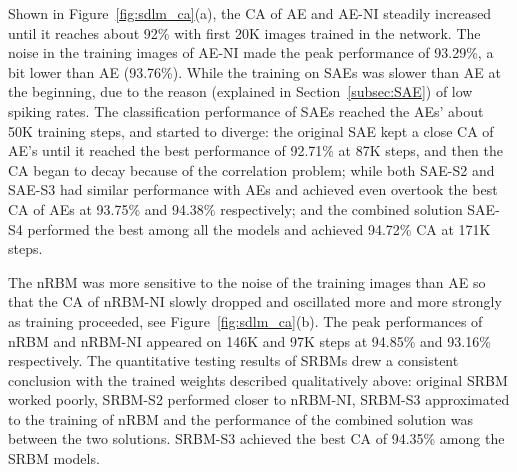 Shown in Figure~\ref{fig:sdlm_ca}(a), the CA of AE and AE-NI steadily increased until it reaches about 92\% with first 20K images trained in the network.
The noise in the training images of AE-NI made the peak performance of 93.29\%, a bit lower than AE (93.76\%).
While the training on SAEs was slower than AE at the beginning, due to the reason (explained in Section~\ref{subsec:SAE}) of low spiking rates.
The classification performance of SAEs reached the AEs' about 50K training steps, and started to diverge:
the original SAE kept a close CA of AE's until it reached the best performance of 92.71\% at 87K steps, and then the CA began to decay because of the correlation problem;
while both SAE-S2 and SAE-S3 had similar performance with AEs and achieved even overtook the best CA of AEs at 93.75\% and 94.38\% respectively;
and the combined solution SAE-S4 performed the best among all the models and achieved 94.72\% CA at 171K steps.

The nRBM was more sensitive to the noise of the training images than AE so that the CA of nRBM-NI slowly dropped and oscillated more and more strongly as training proceeded, see Figure~\ref{fig:sdlm_ca}(b).
The peak performances of nRBM and nRBM-NI appeared on 146K and 97K steps at 94.85\% and 93.16\% respectively. 
The quantitative testing results of SRBMs drew a consistent conclusion with the trained weights described qualitatively above:
original SRBM worked poorly, SRBM-S2 performed closer to nRBM-NI, SRBM-S3 approximated to the training of nRBM and the performance of the combined solution was between the two solutions.
SRBM-S3 achieved the best CA of 94.35\% among the SRBM models.

